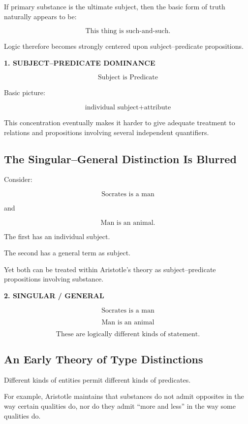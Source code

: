 \documentclass[11pt]{article}
\begin{document}
If primary substance is the ultimate subject, then the basic form
of truth naturally appears to be:

\[
\text{This thing is such-and-such.}
\]

Logic therefore becomes strongly centered upon
subject--predicate propositions.

\begin{whiteboard}
\textbf{1. SUBJECT--PREDICATE DOMINANCE}

\[
\boxed{\text{Subject is Predicate}}
\]

Basic picture:

\[
\text{individual subject}
+
\text{attribute}
\]
\end{whiteboard}

This concentration eventually makes it harder to give adequate
treatment to relations and propositions involving several
independent quantifiers.

\subsection{The Singular--General Distinction Is Blurred}

Consider:

\[
\text{Socrates is a man}
\]

and

\[
\text{Man is an animal}.
\]

The first has an individual subject.

The second has a general term as subject.

Yet both can be treated within Aristotle's theory as
subject--predicate propositions involving substance.

\begin{whiteboard}
\textbf{2. SINGULAR / GENERAL}

\[
\text{Socrates is a man}
\]

\[
\text{Man is an animal}
\]

\[
\boxed{\text{These are logically different kinds of statement.}}
\]
\end{whiteboard}

\subsection{An Early Theory of Type Distinctions}

Different kinds of entities permit different kinds of predicates.

For example, Aristotle maintains that substances do not admit
opposites in the way certain qualities do, nor do they admit
``more and less'' in the way some qualities do.
\end{document}
